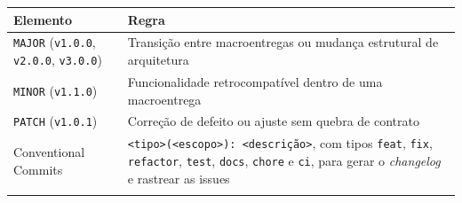 {\footnotesize
\begin{tabularx}{\textwidth}{>{\hsize=0.514\hsize\sloppy\arraybackslash}X >{\hsize=1.486\hsize\sloppy\arraybackslash}X}
\arrayrulecolor{GithubTableBorder}\toprule
\rowcolor{BrandTableHeader}
\textbf{Elemento} & \textbf{Regra} \\
\midrule
\arrayrulecolor{BrandGrayRule}
\texttt{MAJOR} (\texttt{v1.0.0}, \texttt{v2.0.0}, \texttt{v3.0.0}) & Transição entre macroentregas ou mudança estrutural de arquitetura \\
\midrule
\texttt{MINOR} (\texttt{v1.1.0}) & Funcionalidade retrocompatível dentro de uma macroentrega \\
\midrule
\texttt{PATCH} (\texttt{v1.0.1}) & Correção de defeito ou ajuste sem quebra de contrato \\
\midrule
Conventional Commits & \texttt{\textless{}tipo\textgreater{}(\textless{}escopo\textgreater{}):\ \textless{}descrição\textgreater{}}, com tipos \texttt{feat}, \texttt{fix}, \texttt{refactor}, \texttt{test}, \texttt{docs}, \texttt{chore} e \texttt{ci}, para gerar o \emph{changelog} e rastrear as issues \\
\arrayrulecolor{GithubTableBorder}\bottomrule
\end{tabularx}%
}

